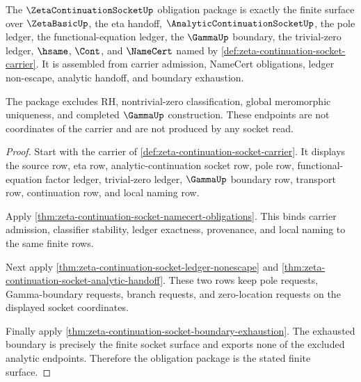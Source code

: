 \begin{theorem}
\label{thm:zeta-continuation-socket-obligation}
The $\ZetaContinuationSocketUp$ obligation package is exactly the finite surface over $\ZetaBasicUp$, the eta handoff, $\AnalyticContinuationSocketUp$, the pole ledger, the functional-equation ledger, the $\GammaUp$ boundary, the trivial-zero ledger, $\hsame$, $\Cont$, and $\NameCert$ named by \autoref{def:zeta-continuation-socket-carrier}. It is assembled from carrier admission, NameCert obligations, ledger non-escape, analytic handoff, and boundary exhaustion.

The package excludes RH, nontrivial-zero classification, global meromorphic uniqueness, and completed $\GammaUp$ construction. These endpoints are not coordinates of the carrier and are not produced by any socket read.
\end{theorem}
\begin{proof}
Start with the carrier of \autoref{def:zeta-continuation-socket-carrier}. It displays the source row, eta row, analytic-continuation socket row, pole row, functional-equation factor ledger, trivial-zero ledger, $\GammaUp$ boundary row, transport row, continuation row, and local naming row.

Apply \autoref{thm:zeta-continuation-socket-namecert-obligations}. This binds carrier admission, classifier stability, ledger exactness, provenance, and local naming to the same finite rows.

Next apply \autoref{thm:zeta-continuation-socket-ledger-nonescape} and \autoref{thm:zeta-continuation-socket-analytic-handoff}. These two rows keep pole requests, Gamma-boundary requests, branch requests, and zero-location requests on the displayed socket coordinates.

Finally apply \autoref{thm:zeta-continuation-socket-boundary-exhaustion}. The exhausted boundary is precisely the finite socket surface and exports none of the excluded analytic endpoints. Therefore the obligation package is the stated finite surface.
\end{proof}
